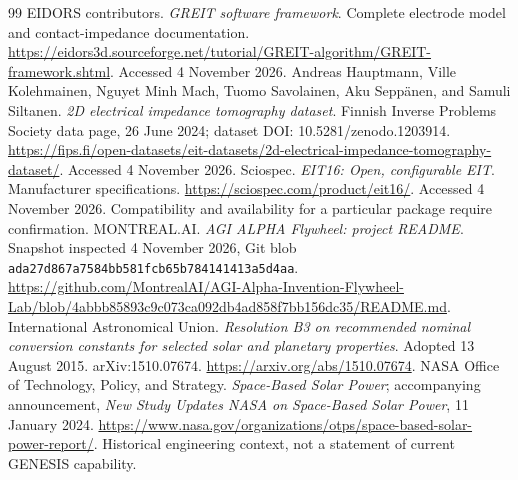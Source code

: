 \documentclass[11pt,letterpaper]{article}
\theoremstyle{remark}\newtheorem{remark}{Remark}[section]
\begin{document}
\begin{thebibliography}{99}
 EIDORS contributors. \emph{GREIT software framework}. Complete electrode model and contact-impedance documentation. \url{https://eidors3d.sourceforge.net/tutorial/GREIT-algorithm/GREIT-framework.shtml}. Accessed 4 November 2026.
 Andreas Hauptmann, Ville Kolehmainen, Nguyet Minh Mach, Tuomo Savolainen, Aku Sepp\"anen, and Samuli Siltanen. \emph{2D electrical impedance tomography dataset}. Finnish Inverse Problems Society data page, 26 June 2024; dataset DOI: 10.5281/zenodo.1203914. \url{https://fips.fi/open-datasets/eit-datasets/2d-electrical-impedance-tomography-dataset/}. Accessed 4 November 2026.
 Sciospec. \emph{EIT16: Open, configurable EIT}. Manufacturer specifications. \url{https://sciospec.com/product/eit16/}. Accessed 4 November 2026. Compatibility and availability for a particular package require confirmation.
 MONTREAL.AI. \emph{AGI ALPHA Flywheel: project README}. Snapshot inspected 4 November 2026, Git blob \texttt{ada27d867a7584bb581fcb65b784141413a5d4aa}. \url{https://github.com/MontrealAI/AGI-Alpha-Invention-Flywheel-Lab/blob/4abbb85893c9c073ca092db4ad858f7bb156dc35/README.md}.
 International Astronomical Union. \emph{Resolution B3 on recommended nominal conversion constants for selected solar and planetary properties}. Adopted 13 August 2015. arXiv:1510.07674. \url{https://arxiv.org/abs/1510.07674}.
 NASA Office of Technology, Policy, and Strategy. \emph{Space-Based Solar Power}; accompanying announcement, \emph{New Study Updates NASA on Space-Based Solar Power}, 11 January 2024. \url{https://www.nasa.gov/organizations/otps/space-based-solar-power-report/}. Historical engineering context, not a statement of current GENESIS capability.
\end{thebibliography}
\end{document}
